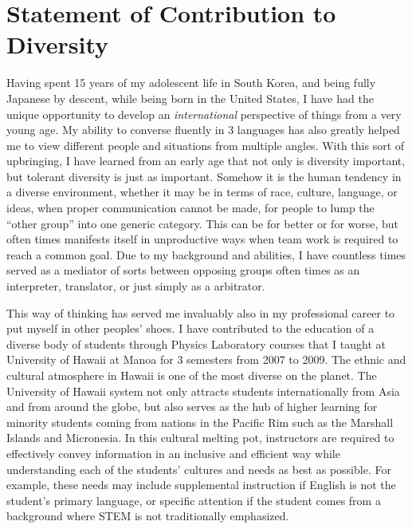 \documentclass[10pt]{article} %
\begin{document}
\clearpage
\section{Statement of Contribution to Diversity}

Having spent 15 years of my adolescent life in South Korea, and being fully
Japanese by descent, while being born in the United States, I have had the
unique opportunity to develop an \emph{international} perspective of things
from a very young age. My ability to converse fluently in 3 languages has also
greatly helped me to view different people and situations from multiple angles.
With this sort of upbringing, I have learned from an early age that not only is
diversity important, but tolerant diversity is just as important. Somehow it is
the human tendency in a diverse environment, whether it may be in terms of
race, culture, language, or ideas, when proper communication cannot be made,
for people to lump the ``other group'' into one generic category. This can be
for better or for worse, but often times manifests itself in unproductive ways
when team work is required to reach a common goal. Due to my background and
abilities, I have countless times served as a mediator of sorts between
opposing groups often times as an interpreter, translator, or just simply as a
arbitrator.

This way of thinking has served me invaluably also in my professional career to
put myself in other peoples' shoes. I have contributed to the education of a
diverse body of students through Physics Laboratory courses that I taught at
University of Hawaii at Manoa for 3 semesters from 2007 to 2009. The ethnic and
cultural atmosphere in Hawaii is one of the most diverse on the planet. The
University of Hawaii system not only attracts students internationally from
Asia and from around the globe, but also serves as the hub of higher learning
for minority students coming from nations in the Pacific Rim such as the
Marshall Islands and Micronesia. In this cultural melting pot, instructors are
required to effectively convey information in an inclusive and efficient way
while understanding each of the students' cultures and needs as best as
possible. For example, these needs may include supplemental instruction if
English is not the student's primary language, or specific attention if the
student comes from a background where STEM is not traditionally emphasized.
\end{document}
